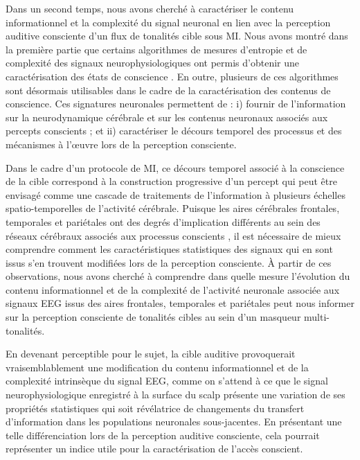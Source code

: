 Dans un second temps, nous avons cherché à caractériser le contenu informationnel et la complexité du signal neuronal en lien avec la perception auditive consciente d'un flux de tonalités cible sous MI. 
Nous avons montré dans la première partie que certains algorithmes de mesures d’entropie et de complexité des signaux neurophysiologiques ont permis d’obtenir une caractérisation des états de conscience \citep{curley2018characterization, engemann2018robust, engemann2020combining, king2014characterizingthesis, liang2015eeg, sitt2014large}. 
En outre, plusieurs de ces algorithmes sont désormais utilisables dans le cadre de la caractérisation des contenus de conscience. 
Ces signatures neuronales permettent de : i) fournir de l’information sur la neurodynamique cérébrale et sur les contenus neuronaux associés aux percepts conscients ; et ii) caractériser le décours temporel des processus et des mécanismes à l’œuvre lors de la perception consciente.

Dans le cadre d'un protocole de MI, ce décours temporel associé à la conscience de la cible correspond à la construction progressive d'un percept qui peut être envisagé comme une cascade de traitements de l'information à plusieurs échelles spatio-temporelles de l'activité cérébrale. 
Puisque les aires cérébrales frontales, temporales et pariétales ont des degrés d'implication différents au sein des réseaux cérébraux associés aux processus conscients \citep{dehaene2011experimental, eriksson2007similar, wiegand2018cortical}, il est nécessaire de mieux comprendre comment les caractéristiques statistiques des signaux qui en sont issus s'en trouvent modifiées lors de la perception consciente. 
À partir de ces observations, nous avons cherché à comprendre dans quelle mesure l'évolution du contenu informationnel et de la complexité de l'activité neuronale associée aux signaux EEG issus des aires frontales, temporales et pariétales peut nous informer sur la perception consciente de tonalités cibles au sein d'un masqueur multi-tonalités. 

En devenant perceptible pour le sujet, la cible auditive provoquerait vraisemblablement une modification du contenu informationnel et de la complexité intrinsèque du signal EEG, comme on s'attend à ce que le signal neurophysiologique enregistré à la surface du scalp présente une variation de ses propriétés statistiques qui soit révélatrice de changements du transfert d'information dans les populations neuronales sous-jacentes. 
En présentant une telle différenciation lors de la perception auditive consciente, cela pourrait représenter un indice utile pour la caractérisation de l'accès conscient. 

